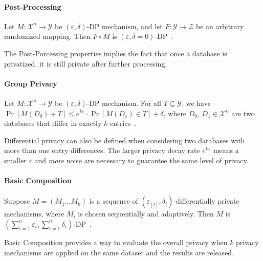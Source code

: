 \paragraph{Post-Processing}
\begin{theorem} Let $M:\mathcal{X}^{n} \rightarrow \mathcal{Y}$ be $\left( \varepsilon ,\delta \right)$-DP mechanism, and let $F:\mathcal{Y}\rightarrow \mathcal{Z}$  be an arbitrary randomized mapping. Then $F\circ M$ is $\left( \varepsilon ,\delta=0 \right)$-DP~\cite{dwork2014algorithmic}.
\end{theorem}
The Post-Porcessing properties implies the fact that once a database is privatized, it is still private after further processing.

\paragraph{Group Privacy}
\begin{theorem} Let $M:\mathcal{X}^{n} \rightarrow \mathcal{Y}$ be $\left( \varepsilon ,\delta \right)$-DP mechanism. For all $T\subseteq \mathcal{Y}$, we have $\Pr \left[ M\left(D_{0}\right) +T\right] \leq e^{k \varepsilon}\cdot \Pr \left[ M\left( D_{1}\right) \in T\right] +\delta$, where $D_{0}$, $D_{1}\in \mathcal{X}^{n}$ are two databases that differ in exactly $k$ entries~\cite{dwork2014algorithmic}.
\end{theorem}

Differential privacy can also be defined when considering two databases with more than one entry differences. The larger privacy decay rate $e^{k\varepsilon}$ means a smaller $\varepsilon$ and \textit{more} noise are necessary to guarantee the same level of privacy.

\paragraph{Basic Composition}
\begin{theorem}
    Suppose $M=\left( M_{1}\ldots M_{k}\right)$  is a sequence of $\left( \varepsilon_[i] ,\delta_{i} \right)$-differentially private mechanisms, where $M_{i}$ is chosen sequentially and adaptively. Then $M$ is $\left(\sum_{i=1}^n\varepsilon_{i} ,\sum_{i=1}^n\delta_{i} \right)$-DP~\cite{dwork2014algorithmic}.
\end{theorem}

Basic Composition provides a way to evaluate the overall privacy when $k$ privacy mechanisms are applied on the same dataset and the results are released.


